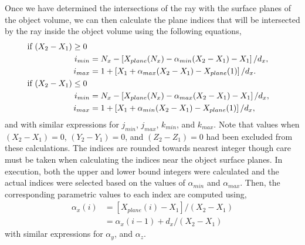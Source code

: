 Once we have determined the intersections of the ray with the surface planes of the object volume, we can then calculate the plane indices that will be intersected by the ray inside the object volume using the following equations, 
%
\begin{equation}
	\begin{aligned}
	\text{if $ (X_2 - X_1) \geq 0 $ }\\
	i_{min} &= N_x - \left[ X_{plane}(N_x) - \alpha_{min} (X_2 - X_1) - X_1 \right] /  d_x, \\
	i_{max} &= 1 + \left[ X_1 + \alpha_{max} (X_2 - X_1) - X_{plane}(1) \right] / d_x. \\
	\text{if $ (X_2 - X_1) \leq 0 $ }\\
	i_{min} &= N_x - \left[ X_{plane}(N_x) - \alpha_{max} (X_2 - X_1) - X_1 \right] /  d_x, \\
	i_{max} &= 1 + \left[ X_1 + \alpha_{min} (X_2 - X_1) - X_{plane}(1) \right] / d_x, 
	\end{aligned}
\label{eq:siddon_ijkminmax}
\end{equation}
%
and with similar expressions for $j_{min}$, $j_{max}$, $k_{min}$, and $k_{max}$.  Note that values when $(X_2 - X_1) = 0$, $(Y_2 - Y_1) = 0$, and $(Z_2 - Z_1) = 0$ had been excluded from these calculations.  The indices are rounded towards nearest integer though care must be taken when calculating the indices near the object surface planes.  In execution, both the upper and lower bound integers were calculated and the actual indices were selected based on the values of $\alpha_{min}$ and $\alpha_{max}$.  Then, the corresponding parametric values to each index are computed using,
%
\begin{equation}
\begin{aligned}
\alpha_x(i) &= [ X_{plane}(i) - X_1 ] / (X_2 - X_1) \\
			&=\alpha_x(i-1) + d_x / (X_2 - X_1) \,
\end{aligned}
\label{ea:siddon_alphas}
\end{equation}
%
with similar expressions for $\alpha_y$, and $\alpha_z$.  

